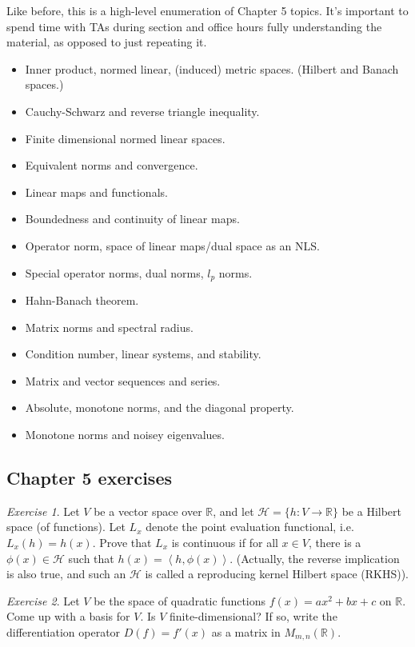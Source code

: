 \documentclass[11pt]{article}
\newcommand{\R}{\ensuremath{\mathbb R}}
\renewcommand{\H}{\ensuremath{\mathcal H}}
\newcommand{\ip}[2]{\left\langle #1, #2\right\rangle}
\theoremstyle{plain}
\theoremstyle{definition}
\theoremstyle{remark}
\newtheorem{exc}{Exercise}[section]
\begin{document}
Like before, this is a high-level enumeration of Chapter 5 topics. It's important to spend time with TAs during section and office hours fully understanding the material, as opposed to just repeating it.
\begin{itemize}
    \item Inner product, normed linear, (induced) metric spaces. (Hilbert and Banach spaces.)
    \item Cauchy-Schwarz and reverse triangle inequality.
    \item Finite dimensional normed linear spaces.
    \item Equivalent norms and convergence.
    \item Linear maps and functionals.
    \item Boundedness and continuity of linear maps.
    \item Operator norm, space of linear maps/dual space as an NLS.
    \item Special operator norms, dual norms, $l_p$ norms.
    \item Hahn-Banach theorem.
    \item Matrix norms and spectral radius.
    \item Condition number, linear systems, and stability.
    \item Matrix and vector sequences and series.
    \item Absolute, monotone norms, and the diagonal property.
    \item Monotone norms and noisey eigenvalues.
\end{itemize}

\subsection*{Chapter 5 exercises}

\begin{exc}
    Let $V$ be a vector space over $\R$, and let $\H = \{h : V \rightarrow \R\}$ be a Hilbert space (of functions). Let $L_x$ denote the point evaluation functional, i.e. $L_x(h) = h(x)$. Prove that $L_x$ is continuous if for all $x \in V$, there is a $\phi(x) \in \H$ such that $h(x) = \ip{h}{\phi(x)}$. (Actually, the reverse implication is also true, and such an $\H$ is called a reproducing kernel Hilbert space (RKHS)). 
\end{exc}

\begin{exc}
    Let $V$ be the space of quadratic functions $f(x) = ax^2 + bx + c$ on $\R$. Come up with a basis for $V$. Is $V$ finite-dimensional? If so, write the differentiation operator $D(f) = f'(x)$ as a matrix in $M_{m,n}(\R)$.
\end{exc}
\end{document}
